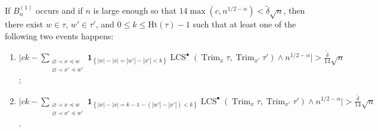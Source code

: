 \documentclass[11pt,reqno]{amsart}
\newcommand{\1}{\mathbf{1}}
\newcommand{\0}{\mathbf{0}}
\newcommand{\I}[1]{{\mathbf 1}_{\left\{#1\right\}}}
\newcommand{\Ht}{\mathrm{Ht}}
\newcommand{\Trim}{\operatorname{Trim}}
\newcommand{\LCS}{\operatorname{LCS}}
\begin{document}
\begin{lem}
\label{deter_lemma:no_sausages}
If $B_n^{(1)}$ occurs and if $n$ is large enough so that $14\max(c,n^{1/2-\alpha})<\tilde{\delta}\sqrt{n}$, then there exist $w \in \tau$,  $w'\in \tau'$, and $0\leq k\leq \Ht(\tau)-1$ such that at least one of the following two events happens:
\begin{enumerate}
\item[\emph{(i)}] $\displaystyle{\Bigg|ck- \!\sum_{\substack{\varnothing \prec x\preceq w \\ \varnothing \prec x'\preceq w'}}\! \I{|w|-|x|=|w'|-|x'|<k} \LCS^\bullet\left(\Trim_{x}\tau,\Trim_{x'}\tau'\right)\wedge n^{1/2-\alpha}\Bigg|>\tfrac{\tilde\delta}{14} \sqrt{n} }$;
\item[\emph{(ii)}] $\displaystyle{\Bigg|ck- \!\sum_{\substack{\varnothing \prec x\preceq w \\ \varnothing \prec x'\preceq w'}}\! \I{|w|-|x|=k-1-(|w'|-|x'|)<k} \LCS^\bullet\left(\Trim_{x}\tau,\Trim_{x'}\tau'\right)\wedge n^{1/2-\alpha}\Bigg|>\tfrac{\tilde\delta}{14} \sqrt{n} }$.
\end{enumerate}
\end{lem}
\end{document}
